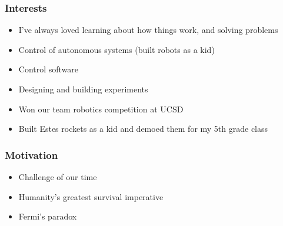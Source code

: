 \documentclass[aspectratio=169]{beamer}
\begin{document}
\begin{frame}
  \frametitle{Interests} 
  \begin{itemize}
  \item I've always loved learning about how things work,
    and solving problems
  \item Control of autonomous systems (built robots as a kid)
  \item Control software
  \item Designing and building experiments
  \item Won our team robotics competition at UCSD
  \item Built Estes rockets as a kid and demoed them for my 5th grade
    class
  \end{itemize}
\end{frame}

\begin{frame}
  \frametitle{Motivation}
  \begin{itemize}
  \item Challenge of our time
  \item Humanity's greatest survival imperative
  \item Fermi's paradox
  \end{itemize}
\end{frame}
\end{document}
